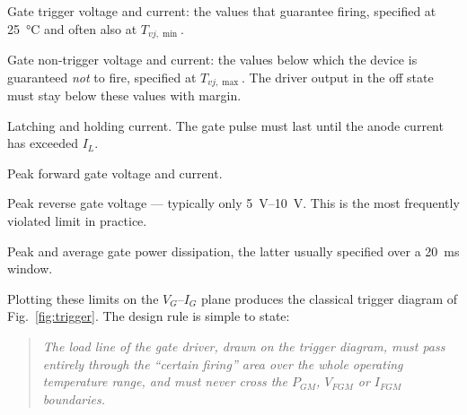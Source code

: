 \documentclass[11pt,a4paper]{article}
\begin{document}
\begin{description}[style=nextline,leftmargin=2.2cm,labelwidth=2cm]
  \item[$V_{GT}$, $I_{GT}$] Gate trigger voltage and current: the values that
        guarantee firing, specified at \SI{25}{\celsius} and often also at
        $T_{vj,\min}$.
  \item[$V_{GD}$, $I_{GD}$] Gate non-trigger voltage and current: the values below
        which the device is guaranteed \emph{not} to fire, specified at
        $T_{vj,\max}$. The driver output in the off state must stay below these
        values with margin.
  \item[$I_L$, $I_H$] Latching and holding current. The gate pulse must last until
        the anode current has exceeded $I_L$.
  \item[$V_{FGM}$, $I_{FGM}$] Peak forward gate voltage and current.
  \item[$V_{RGM}$] Peak reverse gate voltage --- typically only
        \SIrange{5}{10}{\volt}. This is the most frequently violated limit in
        practice.
  \item[$P_{GM}$, $P_{G(AV)}$] Peak and average gate power dissipation, the latter
        usually specified over a \SI{20}{\milli\second} window.
\end{description}

Plotting these limits on the $V_G$--$I_G$ plane produces the classical trigger
diagram of Fig.~\ref{fig:trigger}. The design rule is simple to state:

\begin{quote}
\emph{The load line of the gate driver, drawn on the trigger diagram, must pass
entirely through the ``certain firing'' area over the whole operating temperature
range, and must never cross the $P_{GM}$, $V_{FGM}$ or $I_{FGM}$ boundaries.}
\end{quote}
\end{document}
